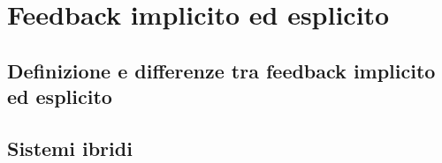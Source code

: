 \section{Feedback implicito ed
esplicito}\label{feedback-implicito-ed-esplicito}

\subsection{Definizione e differenze tra feedback implicito ed
esplicito}\label{definizione-e-differenze-tra-feedback-implicito-ed-esplicito}

\subsection{Sistemi ibridi}\label{sistemi-ibridi}
